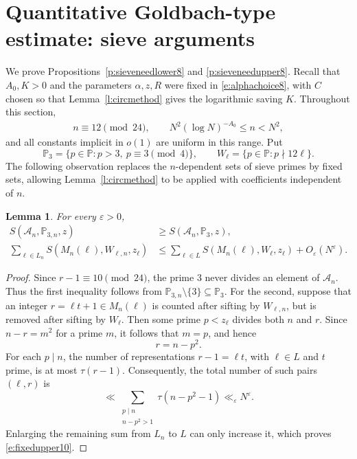 \documentclass[12pt,reqno]{amsart}
\numberwithin{equation}{section}
\newtheorem{lemma}[equation]{Lemma}
\theoremstyle{definition}
\theoremstyle{remark}
\begin{document}
\section{Quantitative Goldbach-type estimate: sieve arguments}
\label{s:sieveGB}

We prove Propositions~\ref{p:sieveneedlower8} and
\ref{p:sieveneedupper8}.  Recall that \(A_0,K>0\) and the parameters
\(\alpha,z,R\) were fixed in \eqref{e:alphachoice8}, with \(C\) chosen
so that Lemma~\ref{l:circmethod} gives the logarithmic saving \(K\).
Throughout this section,
\begin{align}\label{e:nrange10}
     n\equiv12\pmod{24},
 \qquad
 N^2(\log N)^{-A_0}\leq n<N^2,
\end{align}
and all constants implicit in \(o(1)\) are uniform in this range. Put
\[
 \mathbb P_3
 =\{p\in\mathbb P:p>3,\ p\equiv3\pmod4\},
 \qquad
 W_\ell=\{p\in\mathbb P:p\nmid12\ell\}.
\]
The following observation replaces the \(n\)-dependent sets of sieve
primes by fixed sets, allowing Lemma~\ref{l:circmethod} to be applied
with coefficients independent of \(n\).

\begin{lemma}\label{l:fixedsievesets10}
For every \(\varepsilon>0\),
\begin{align}
 S(\mathcal A_n,\mathbb P_{3,n},z)
 &\geq S(\mathcal A_n,\mathbb P_3,z),
 \label{e:fixedlower10}\\
 \sum_{\ell\in L_n}S(M_n(\ell),W_{\ell,n},z_\ell)
 &\leq
 \sum_{\ell\in L}S(M_n(\ell),W_\ell,z_\ell)
 +O_\varepsilon(N^\varepsilon).
 \label{e:fixedupper10}
\end{align}
\end{lemma}

\begin{proof}
Since \(r-1\equiv10\pmod{24}\), the prime \(3\) never divides an
element of \(\mathcal A_n\).  Thus the first inequality follows from
\(\mathbb P_{3,n}\setminus\{3\}\subseteq\mathbb P_3\).  For the
second, suppose that an integer \(r=\ell t+1\in M_n(\ell)\) is counted
after sifting by \(W_{\ell,n}\), but is removed after sifting by
\(W_\ell\).  Then some prime \(p<z_\ell\) divides both \(n\) and
\(r\).  Since \(n-r=m^2\) for a prime \(m\), it follows that \(m=p\),
and hence
\[
 r=n-p^2.
\]
For each \(p\mid n\), the number of representations
\(r-1=\ell t\), with \(\ell\in L\) and \(t\) prime, is at most
\(\tau(r-1)\).  Consequently, the total number of such pairs
\((\ell,r)\) is
\[
 \ll\sum_{\substack{p\mid n\\n-p^2>1}}
 \tau(n-p^2-1)\ll_\varepsilon N^\varepsilon.
\]
Enlarging the remaining sum from \(L_n\) to \(L\) can only increase it,
which proves \eqref{e:fixedupper10}.
\end{proof}
\end{document}
